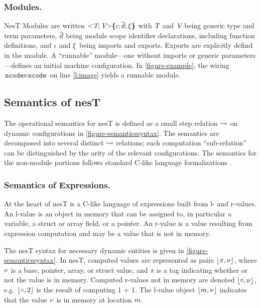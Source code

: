 \subsubsection{Modules.}
NesT Modules are written $\mathrm{<}\textit{T}; \textit{V}\mathrm{>}\textup{\textbf{\{}} \iota; \overline{d}; \xi \textup{\textbf{\}}} $ with
$\textit{T}$ and $\textit{V}$ being generic type and term parameters, $\overline{d}$ being module scope
identifier declarations, including function definitions, and $\iota$ and $\xi$ being
imports and exports. Exports are explicitly defind in the module. A ``runnable'' module---one
without imports or generic parameters---defines an initial machine configuration. In
\autoref{figure-example}, the wiring $\texttt{ncode} \ltimes \texttt{scode}$ on line
\ref{l:image} yields a runnable module.

\tasksemanticsfig

\declsemanticsfig

\subsection{Semantics of nesT} 
\label{section-nestsemantics}

The operational semantics for nesT is defined as a small step relation $\leadsto$ on dynamic
configurations in \autoref{figure-semanticssyntax}. The semantics are decomposed into several
distinct $\leadsto$ relations; each computation ``sub-relation'' can be distinguished by the
arity of the relevant configurations. The semantics for the non-module portions follows standard
C-like language formalizations \cite{Leroy-compcert-06,grossman03}.

\subsubsection{Semantics of Expressions.}
At the heart of nesT is a C-like language of expressions built from l- and r-values. An l-value
is an object in memory that can be assigned to, in particular a variable, a struct or array
field, or a pointer. An r-value is a value resulting from expression computation and may be a
value that is not in memory.

The nesT syntax for necessary dynamic entities is given in \autoref{figure-semanticssyntax}. In
nesT, computed values are represented as pairs $\lfloor \pi,{\nu} \rfloor$, where ${\nu}$ is a base,
pointer, array, or struct value, and $\pi$ is a tag indicating whether or not the value is in
memory. Computed r-values not in memory are denoted $\lfloor \circ,{\nu} \rfloor$, e.g. $\lfloor \circ,2 \rfloor$
is the result of computing 1 + 1. The l-value object $\lfloor m,{\nu} \rfloor$ indicates that the value
${\nu}$ is in memory at location $m$.

